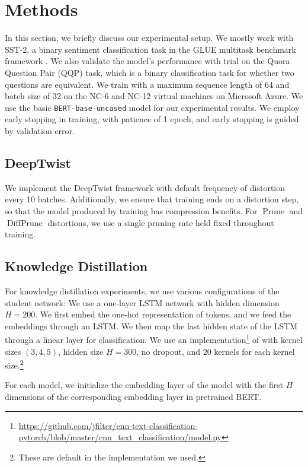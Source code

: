 \documentclass[10pt]{article}
\newcommand{\prune}{\operatorname{Prune}}
\newcommand{\diffprune}{\operatorname{DiffPrune}}
\begin{document}
\section{Methods}
In this section, we briefly discuss our experimental setup. We mostly
work with
SST-2, a binary sentiment classification task in the GLUE multitask benchmark
framework \citep{wang2018glue}. We also validate the model's
performance with trial on the Quora Question Pair (QQP) task, which is a
binary classification task for whether two questions are equivalent. We
train with a maximum sequence length of 64 and batch size of 32 on the
NC-6 and NC-12 virtual machines on Microsoft Azure. We use the basic 
\texttt{BERT-base-uncased} model for our experimental results. We employ
early stopping in training, with patience of 1 epoch, and early stopping is
guided by validation error. 

\subsection{DeepTwist}
We implement the DeepTwist framework with default frequency of distortion
every 10 batches. Additionally, we ensure that training ends on a
distortion step, so that the model produced by training has compression
benefits. For $\prune$ and $\diffprune$ distortions, we use a single
pruning rate held fixed throughout training. 


\subsection{Knowledge Distillation}

For knowledge distillation experiments, we use various configurations of the
student network:  We use a one-layer LSTM network with hidden
dimension $H=200$. We first embed the one-hot representation of tokens, and we
feed the embeddings through an LSTM. We then map the last hidden state of the
LSTM through a linear layer for classification.   We use an
implementation\footnote{\url{https://github.com/jfilter/cnn-text-classification-pytorch/blob/master/cnn_text_classification/model.py}}
of \citet{kim2014convolutional} with kernel sizes $(3,4,5)$, hidden size
$H=300$, no dropout, and $20$ kernels for each kernel size.\footnote{These are
default in the implementation we used.} 

For each model, we initialize the embedding layer of the model with the
first $H$ dimensions of the corresponding embedding layer in pretrained
BERT. 
\end{document}
